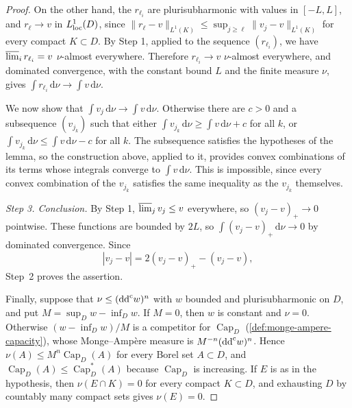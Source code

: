 \begin{proof}
On the other hand, the $r_{\ell_i}$ are plurisubharmonic with values in $[-L,L]$, and $r_\ell\to v$ in $L^1_{\mathrm{loc}}(D)$, since $\|r_\ell-v\|_{L^1(K)}\le\sup_{j\ge\ell}\|v_j-v\|_{L^1(K)}$ for every compact $K\subset D$. By Step 1, applied to the sequence $(r_{\ell_i})$, we have $\varlimsup_ir_{\ell_i}=v$ $\nu$-almost everywhere. Therefore $r_{\ell_i}\to v$ $\nu$-almost everywhere, and dominated convergence, with the constant bound $L$ and the finite measure $\nu$, gives $\int r_{\ell_i}\,\mathrm d\nu\to\int v\,\mathrm d\nu$.

We now show that $\int v_j\,\mathrm d\nu\to\int v\,\mathrm d\nu$. Otherwise there are $c>0$ and a subsequence $(v_{j_k})$ such that either $\int v_{j_k}\,\mathrm d\nu\ge\int v\,\mathrm d\nu+c$ for all $k$, or $\int v_{j_k}\,\mathrm d\nu\le\int v\,\mathrm d\nu-c$ for all $k$. The subsequence satisfies the hypotheses of the lemma, so the construction above, applied to it, provides convex combinations of its terms whose integrals converge to $\int v\,\mathrm d\nu$. This is impossible, since every convex combination of the $v_{j_k}$ satisfies the same inequality as the $v_{j_k}$ themselves.

\emph{Step 3. Conclusion.} By Step 1, $\varlimsup_jv_j\le v$ everywhere, so $(v_j-v)_+\to0$ pointwise. These functions are bounded by $2L$, so $\int(v_j-v)_+\,\mathrm d\nu\to0$ by dominated convergence. Since
\[
 |v_j-v|=2(v_j-v)_+-(v_j-v),
\]
Step~2 proves the assertion.

Finally, suppose that $\nu\le(\mathrm{dd}^{\mathrm{c}} w)^n$ with $w$ bounded and plurisubharmonic on $D$, and put $M=\sup_Dw-\inf_Dw$. If $M=0$, then $w$ is constant and $\nu=0$. Otherwise $(w-\inf_Dw)/M$ is a competitor for $\operatorname{Cap}_D$ (\cref{def:monge-ampere-capacity}), whose Monge--Amp\`ere measure is $M^{-n}(\mathrm{dd}^{\mathrm{c}} w)^n$. Hence $\nu(A)\leq M^n\operatorname{Cap}_D(A)$ for every Borel set $A\subset D$, and $\operatorname{Cap}_D(A)\le\operatorname{Cap}_D^*(A)$ because $\operatorname{Cap}_D$ is increasing. If $E$ is as in the hypothesis, then $\nu(E\cap K)=0$ for every compact $K\subset D$, and exhausting $D$ by countably many compact sets gives $\nu(E)=0$.
\end{proof}

